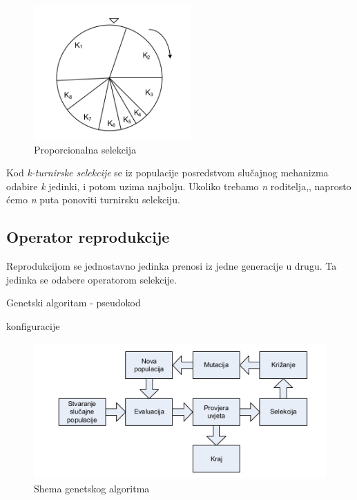 \documentclass[times, utf8, zavrsni]{fer}
\begin{document}
\begin{figure}[htb]
\centering
\includegraphics[width=6cm]{img/selekcija.png}
\caption{Proporcionalna selekcija}
\label{fig:selekcija}
\end{figure}

Kod \emph{k-turnirske selekcije} se iz populacije posredstvom slučajnog mehanizma odabire \emph{k} jedinki, i potom uzima najbolju. Ukoliko trebamo \emph{n} roditelja,, naprosto ćemo \emph{n} puta ponoviti turnirsku selekciju.

\subsection{Operator reprodukcije}
Reprodukcijom se jednostavno jedinka prenosi iz jedne generacije u drugu. Ta jedinka se odabere operatorom selekcije.

\begin{algorithm}
\caption{Genetski algoritam - pseudokod}
\label{alg:genetski}
\begin{algorithmic}
\REPEAT
{}
konfiguracije
\ENDWHILE
{}
\end{algorithmic}
\end{algorithm}

\begin{figure}[htb]
\centering
\includegraphics[width=12cm]{img/genetski_shema.png}
\caption{Shema genetskog algoritma}
\label{fig:genetski_shema}
\end{figure}
\end{document}
